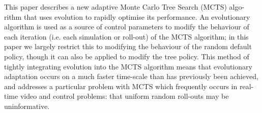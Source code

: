 \cite{lucas2014fast} This paper describes a new adaptive Monte Carlo Tree Search (MCTS) algo- rithm that uses evolution to rapidly optimise its performance. An evolutionary algorithm is used as a source of control parameters to modify the behaviour of each iteration (i.e. each simulation or roll-out) of the MCTS algorithm; in this paper we largely restrict this to modifying the behaviour of the random default policy, though it can also be applied to modify the tree policy.
This method of tightly integrating evolution into the MCTS algorithm means that evolutionary adaptation occurs on a much faster time-scale than has previously been achieved, and addresses a particular problem with MCTS which frequently occurs in real-time video and control problems: that uniform random roll-outs may be uninformative.
